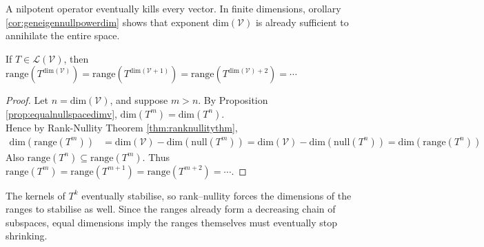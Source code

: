 A nilpotent operator eventually kills every vector. In finite dimensions, orollary \ref{cor:geneigennullpowerdim} shows that exponent $\text{dim}(\mathcal{V})$ is already sufficient to annihilate the entire space.

\begin{proposition} \label{prop:rangestablise} If $T \in \mathcal{L}(\mathcal{V})$, then $\text{range}(T^{\text{dim}(\mathcal{V})}) = \text{range}(T^{\text{dim}(\mathcal{V}+1)}) = \text{range}(T^{\text{dim}(\mathcal{V})+2}) = \cdots$
\begin{proof} Let $n = \text{dim}(\mathcal{V})$, and suppose $m > n$. By Proposition \ref{prop:equalnullspacedimv}, $\text{dim}(T^m) = \text{dim}(T^n)$.\\
Hence by Rank-Nullity Theorem \ref{thm:ranknullitythm},
\begin{align}
\text{dim}(\text{range}(T^m)) &= \text{dim}(\mathcal{V}) - \text{dim}(\text{null}(T^m)) = \text{dim}(\mathcal{V}) - \text{dim}(\text{null}(T^n)) = \text{dim}(\text{range}(T^n)) \nonumber
\end{align}
Also $\text{range}(T^n) \subseteq \text{range}(T^m)$. Thus $\text{range}(T^m) = \text{range}(T^{m+1}) = \text{range}(T^{m+2}) = \cdots$.
\end{proof}
\end{proposition}

The kernels of $T^k$ eventually stabilise, so rank–nullity forces the dimensions of the ranges to stabilise as well. Since the ranges already form a decreasing chain of subspaces, equal dimensions imply the ranges themselves must eventually stop shrinking.


